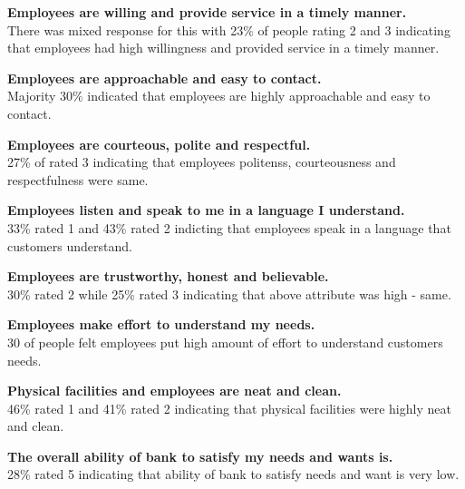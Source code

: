 \documentclass[a4paper, 12pt]{extarticle}
\begin{document}
{\par \textbf{ Employees are willing and provide service in a timely manner.} \\
There was mixed response for this with 23\% of people rating 2 and 3 indicating that employees had high willingness and provided service in a timely manner. \\

\par \textbf{ Employees are approachable and easy to contact.} \\   
Majority 30\% indicated that employees are highly approachable and easy to contact. \\

\par \textbf{ Employees are courteous, polite and respectful.} \\
27\% of rated 3 indicating that employees politenss, courteousness and respectfulness were same. \\

\par \textbf{ Employees listen and speak to me in  a language I understand.} \\
33\% rated 1 and 43\% rated 2 indicting that employees speak in a language that customers understand. \\

\par \textbf{ Employees are trustworthy, honest and believable.}  \\
30\% rated 2 while 25\% rated 3 indicating that above attribute was high - same. \\

\par \textbf{ Employees make effort to understand my needs.} \\
30 of people felt employees put high amount of effort to understand customers needs. \\

\par \textbf{ Physical facilities and employees are neat and clean.}\\
46\% rated 1 and 41\% rated 2 indicating that physical facilities were highly neat and clean. \\

\par \textbf{ The overall ability of bank to satisfy my needs and wants is.} \\
28\% rated 5 indicating that ability of bank to satisfy needs and want is very low.\\

}
\end{document}
